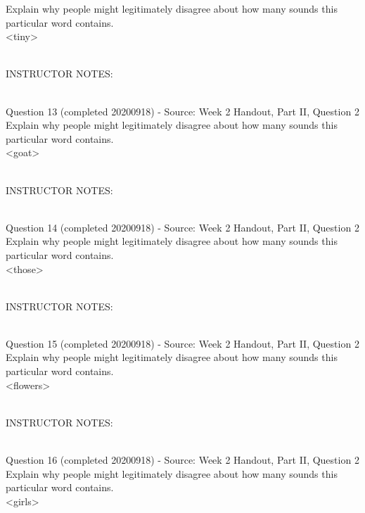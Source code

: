 \documentclass[12pt]{article}
\begin{document}
Explain why people might legitimately disagree about how many sounds this particular word contains.\\

<tiny>


~\\
INSTRUCTOR NOTES: 


~\\

{\large Question 13} (completed 20200918) - Source: Week 2 Handout, Part II, Question 2\\

Explain why people might legitimately disagree about how many sounds this particular word contains.\\

<goat>


~\\
INSTRUCTOR NOTES: 


~\\

{\large Question 14} (completed 20200918) - Source: Week 2 Handout, Part II, Question 2\\

Explain why people might legitimately disagree about how many sounds this particular word contains.\\

<those>


~\\
INSTRUCTOR NOTES: 


~\\

{\large Question 15} (completed 20200918) - Source: Week 2 Handout, Part II, Question 2\\

Explain why people might legitimately disagree about how many sounds this particular word contains.\\

<flowers>


~\\
INSTRUCTOR NOTES: 


~\\

{\large Question 16} (completed 20200918) - Source: Week 2 Handout, Part II, Question 2\\

Explain why people might legitimately disagree about how many sounds this particular word contains.\\

<girls>
\end{document}
